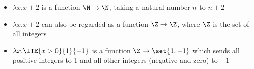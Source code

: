 \begin{itemize}
    \item $\lambda x.x+2$ is a function $\N\to\N$, taking a natural number $n$ to $n+2$
    \item $\lambda x.x+2$ can also be regarded as a function $\Z\to\Z$, where $\Z$ is the set of all integers
    \item $\lambda x.\ITE{x>0}{1}{-1}$ is a function $\Z\to\set{1,-1}$ which sends all positive integers to 1 and all other integers (negative and zero) to $-1$
\end{itemize}
